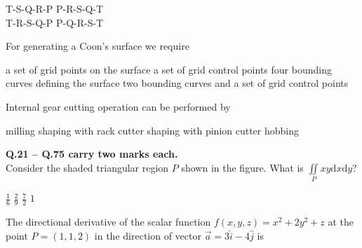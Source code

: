 \documentclass[addpoints,10pt]{exam}
\begin{document}
\begin{questions}
    \begin{oneparchoices}
        \choice T-S-Q-R-P
        \choice P-R-S-Q-T\\
        \choice T-R-S-Q-P
        \choice P-Q-R-S-T
    \end{oneparchoices}

    \question For generating a Coon's surface we require
    \begin{choices}
        \choice a set of grid points on the surface
        \choice a set of grid control points
        \choice four bounding curves defining the surface
        \choice two bounding curves and a set of grid control points
    \end{choices}

    \question Internal gear cutting operation can be performed by
    \begin{choices}
        \choice milling
        \choice shaping with rack cutter
        \choice shaping with pinion cutter
        \choice hobbing
    \end{choices}
\pagebreak
\large\textbf{Q.21 -- Q.75 carry two marks each.}\\
    \question Consider the shaded triangular region $P$ shown in the figure. What is $\iint\limits_P xy\mathrm{d}x\mathrm{d}y$?
    \begin{center}
    \end{center}

    \begin{oneparchoices}
        \choice $\frac{1}{6}$
        \choice $\frac{2}{9}$
        \choice $\frac{7}{2}$
        \choice $1$
    \end{oneparchoices}

    \question The directional derivative of the scalar function $f(x,y,z) = x^2 + 2y^2 + z$ at the point $P=(1,1,2)$ in the direction of vector $\overrightarrow{a} = 3\hat{i} -4\hat{j}$ is


\end{questions}
\end{document}
